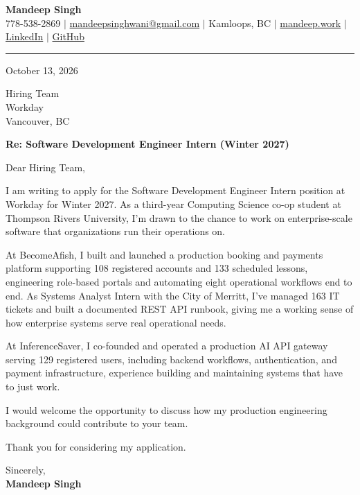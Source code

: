 \documentclass[letterpaper,11pt]{article}
\begin{document}
\begin{center}
    \textbf{\LARGE Mandeep Singh} \\ \vspace{2pt}
    \small 778-538-2869 $|$
    \href{mailto:mandeepsinghwani@gmail.com}{mandeepsinghwani@gmail.com} $|$
    Kamloops, BC $|$
    \href{https://mandeep.work}{mandeep.work} $|$
    \href{https://www.linkedin.com/in/mandeep-singh-b855972a7/}{LinkedIn} $|$
    \href{https://github.com/deepmroot}{GitHub}
\end{center}

\vspace{4pt}
\hrule
\vspace{14pt}

October 13, 2026

\vspace{8pt}
Hiring Team \\
Workday \\
Vancouver, BC

\vspace{8pt}
\textbf{Re: Software Development Engineer Intern (Winter 2027)}

\vspace{10pt}
Dear Hiring Team,

\vspace{4pt}
I am writing to apply for the Software Development Engineer Intern position at Workday for Winter 2027. As a third-year Computing Science co-op student at Thompson Rivers University, I'm drawn to the chance to work on enterprise-scale software that organizations run their operations on.

At BecomeAfish, I built and launched a production booking and payments platform supporting 108 registered accounts and 133 scheduled lessons, engineering role-based portals and automating eight operational workflows end to end. As Systems Analyst Intern with the City of Merritt, I've managed 163 IT tickets and built a documented REST API runbook, giving me a working sense of how enterprise systems serve real operational needs.

At InferenceSaver, I co-founded and operated a production AI API gateway serving 129 registered users, including backend workflows, authentication, and payment infrastructure, experience building and maintaining systems that have to just work.

I would welcome the opportunity to discuss how my production engineering background could contribute to your team.

Thank you for considering my application.

\vspace{16pt}
Sincerely, \\
\vspace{6pt}
\textbf{Mandeep Singh}
\end{document}
